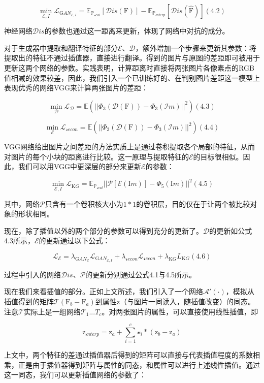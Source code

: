 \documentclass[UTF8,a4paper，12pt]{article}
\def\MC {\mathcal}
\theoremstyle{theorem}
\theoremstyle{definition}
\begin{document}
$$\min_{\MC E,I} \MC L_{\mathrm GAN_{\MC E,I}} = \mathbb E_{\mathbb P_{\MC real}}[\MC Dis(\mathrm F)] - \mathbb E_{\mathbb P_{\MC interp}}[\MC Dis(\hat{\mathrm F})]    (4.2)$$

神经网络$\MC Dis$的参数也通过这一距离来更新，体现了网络中对抗的成分。

对于生成器中提取和翻译特征的部分$\MC E$、$\MC D$，额外增加一个步骤来更新其参数：将提取出的特征不通过插值器，直接进行翻译。得到的图片与原图的差距即可被用于更新这两个网络的参数。实践表明，计算距离时直接将两张图片各像素点的RGB值相减的效果较差，因此，我们引入一个已训练好的、在判别图片差距这一模型上表现优秀的网络VGG来计算两张图片的差距：

$$\min_{\MC D} \MC L_{\MC D} = \mathbb E(||\Phi_3(\MC D(\mathrm F)) - \Phi_3(\MC Im)||^2)    (4.3)$$

$$\min_{\MC E} \MC L_{\MC recon} = \mathbb E(||\Phi_3(\MC D(\mathrm F)) - \Phi_3(\MC Im)||^2)    (4.4)$$

VGG网络给出图片之间差距的方法实质上是通过卷积提取各个局部的特征，从而对图片的每个小块的距离进行比较。这一原理与提取特征的$\MC E$的目标很相似。因此，我们可以用VGG中更深层的部分来更新$\MC E$的参数：

$$\min_{\MC E,I} \MC L_{\mathrm KG} = \mathbb E_{\mathbb P_{\MC real}}||\MC P[\MC E(\mathrm Im)] - \Phi_5(\mathrm Im)||^2    (4.5)$$

其中，网络$\MC P$只含有一个卷积核大小为$1*1$的卷积层，目的仅在于让两个被比较对象的形状相同。

现在，除了插值以外的两个部分的参数可以得到充分的更新了。$\MC D$的更新如公式4.3所示，$\MC E$的更新通过以下公式：

$$\MC L_{\MC E} = \lambda_{\mathrm GAN_{\MC E}}\MC L_{\mathrm GAN_{\MC E,I}} + \lambda_{\MC recon}\MC L_{\MC recon} + \lambda_{\mathrm KG}L_{\mathrm KG}    (4.6)$$

过程中引入的网络$\MC Dis$、$\MC P$的更新分别通过公式4.1与4.5所示。

现在我们来看插值的部分。正如上文所述，我们引入了一个网络$\MC A'(\cdot)$，模拟从插值得到的矩阵$\MC T(\mathrm F_b - \mathrm F_a)$到属性$\mathrm z$（与图片一同读入，随插值改变）的同态。注意$\MC T$实际上是一组网络$\MC T_1...T_c$。对两张图片的属性，可以直接使用线性插值，即

$$\mathrm z_{\MC interp} = \mathrm z_a + \sum_{i=1}^{c}{\MC v_i * (\mathrm z_b - \mathrm z_a)}$$

上文中，两个特征的差通过插值器后得到的矩阵可以直接与代表插值程度的系数相乘，正是由于插值器得到矩阵与属性的同态，和属性可以进行上述线性插值。通过这一同态，我们可以更新插值网络的参数了：
\end{document}
